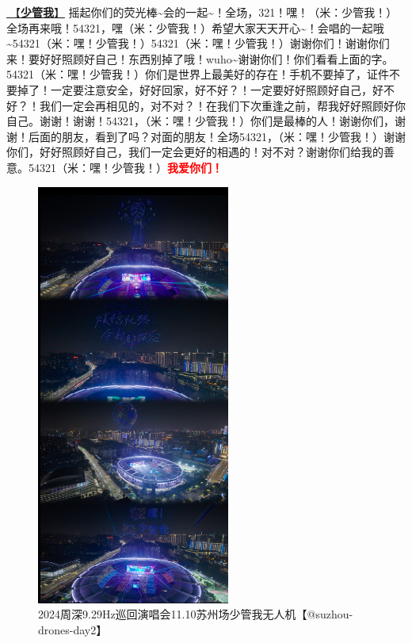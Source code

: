 \documentclass[]{ctexbook}
\begin{document}
\hyperref[watch-ur-manners]{🎵【\textbf{少管我}】} 摇起你们的荧光棒\textasciitilde 会的一起\textasciitilde！全场，321！嘿！（米：少管我！）全场再来哦！54321，嘿（米：少管我！）希望大家天天开心\textasciitilde！会唱的一起哦\textasciitilde54321（米：嘿！少管我！）54321（米：嘿！少管我！）谢谢你们！谢谢你们来！要好好照顾好自己！东西别掉了哦！wuho\textasciitilde 谢谢你们！你们看看上面的字。54321（米：嘿！少管我！）你们是世界上最美好的存在！手机不要掉了，证件不要掉了！一定要注意安全，好好回家，好不好？！一定要好好照顾好自己，好不好？！我们一定会再相见的，对不对？！在我们下次重逢之前，帮我好好照顾好你自己。谢谢！谢谢！54321，（米：嘿！少管我！）你们是最棒的人！谢谢你们，谢谢！后面的朋友，看到了吗？对面的朋友！全场54321，（米：嘿！少管我！）谢谢你们，好好照顾好自己，我们一定会更好的相遇的！对不对？谢谢你们给我的善意。54321（米：嘿！少管我！）\textbf{\textcolor{red}{我爱你们！} }

\begin{figure}

{\centering \includegraphics[width=180pt]{img/suzhou20241110/002} 

}

\caption{2024周深9.29Hz巡回演唱会11.10苏州场少管我无人机【@suzhou-drones-day2】}\label{fig:unnamed-chunk-123}
\end{figure}
\end{document}
